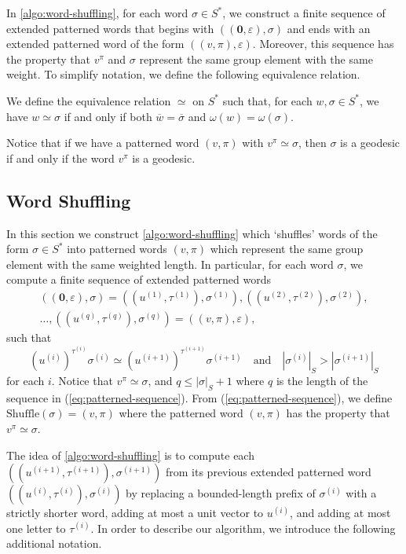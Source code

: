 In \cref{algo:word-shuffling}, for each word $\sigma \in S^*$, we construct a finite sequence of extended patterned words that begins with $((\mathbf{0},\varepsilon),\sigma)$ and ends with an extended patterned word of the form $((v,\pi),\varepsilon)$.
Moreover, this sequence has the property that $v^\pi$ and $\sigma$ represent the same group element with the same weight.
To simplify notation, we define the following equivalence relation.

\begin{definition}\label{defn:equiv-relation}
	We define the equivalence relation $\simeq$ on $S^*$ such that, for each $w,\sigma \in S^*$, we have $w \simeq \sigma$ if and only if both $\overline{w} = \overline{\sigma}$ and $\omega(w) = \omega(\sigma)$.
\end{definition}

Notice that if we have a patterned word $(v,\pi)$ with $v^\pi \simeq \sigma$, then $\sigma$ is a geodesic if and only if the word $v^\pi$ is a geodesic.

\subsection{Word Shuffling}\label{sec:patterned-words/word-shuffling-algorithm}

In this section we construct \cref{algo:word-shuffling} which `shuffles' words of the form $\sigma \in S^*$ into patterned words $(v,\pi)$ which represent the same group element with the same weighted length.
In particular, for each word $\sigma$, we compute a finite sequence of extended patterned words
\begin{multline}\label{eq:patterned-sequence}
	((\mathbf{0},\varepsilon),\sigma)
	=
	((u^{(1)},\tau^{(1)}),\sigma^{(1)}),
	((u^{(2)},\tau^{(2)}),\sigma^{(2)}),\\
	\ldots,
	((u^{(q)},\tau^{(q)}),\sigma^{(q)})
	=
	((v,\pi),\varepsilon),
\end{multline}
such that
\[
	(u^{(i)})^{\tau^{(i)}} \sigma^{(i)}
	\simeq
	(u^{(i+1)})^{\tau^{(i+1)}}\sigma^{(i+1)}
	\quad
	\text{and}
	\quad
	|\sigma^{(i)}|_S > |\sigma^{(i+1)}|_S
\]
for each $i$.
Notice that $v^\pi \simeq \sigma$, and $q \leqslant |\sigma|_S+1$ where $q$ is the length of the sequence in (\ref{eq:patterned-sequence}).
From (\ref{eq:patterned-sequence}), we define $\mathrm{Shuffle}(\sigma) = (v,\pi)$ where the patterned word $(v,\pi)$ has the property that $v^\pi \simeq \sigma$.

The idea of \cref{algo:word-shuffling} is to compute each $((u^{(i+1)},\tau^{(i+1)}),\sigma^{(i+1)})$ from its previous extended patterned word $((u^{(i)},\tau^{(i)}),\sigma^{(i)})$ by replacing a bounded-length prefix of $\sigma^{(i)}$ with a strictly shorter word, adding at most a unit vector to $u^{(i)}$, and adding at most one letter to $\tau^{(i)}$.
In order to describe our algorithm, we introduce the following additional notation.

